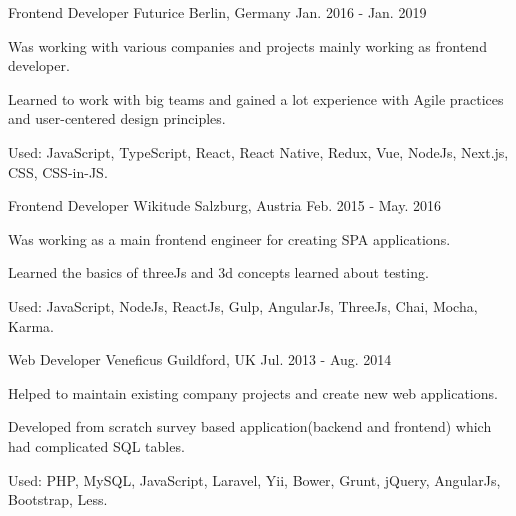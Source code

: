 

\begin{cventries}

  \cventry
    {Frontend Developer} %
    {Futurice} %
    {Berlin, Germany} %
    {Jan. 2016 - Jan. 2019} %
    {
      \begin{cvitems} %
        \item {Was working with various companies and projects mainly working as frontend developer.}
        \item {Learned to work with big teams and gained a lot experience with Agile practices and user-centered design principles.}
        \item {Used: JavaScript, TypeScript, React, React Native, Redux, Vue, NodeJs, Next.js, CSS, CSS-in-JS.}
      \end{cvitems}
    }

  \cventry
    {Frontend Developer} %
    {Wikitude} %
    {Salzburg, Austria} %
    {Feb. 2015 - May. 2016} %
    {
      \begin{cvitems} %
        \item {Was working as a main frontend engineer for creating SPA applications.}
        \item {Learned the basics of threeJs and 3d concepts learned about testing.}
        \item {Used: JavaScript, NodeJs, ReactJs, Gulp, AngularJs, ThreeJs, Chai, Mocha, Karma.}
      \end{cvitems}
    }

  \cventry
    {Web Developer} %
    {Veneficus} %
    {Guildford, UK} %
    {Jul. 2013 - Aug. 2014} %
    {
      \begin{cvitems} %
        \item {Helped to maintain existing company projects and create new web applications.}
        \item {Developed from scratch survey based application(backend and frontend) which had complicated SQL tables.}
        \item {Used: PHP, MySQL, JavaScript, Laravel, Yii, Bower, Grunt, jQuery, AngularJs, Bootstrap, Less.}
      \end{cvitems}
    }

\end{cventries}
